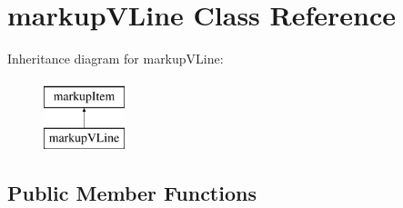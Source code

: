 \hypertarget{classmarkupVLine}{
\section{markupVLine Class Reference}
\label{classmarkupVLine}
}
Inheritance diagram for markupVLine:\begin{figure}[H]
\begin{center}
\leavevmode
\includegraphics[height=2.000000cm]{classmarkupVLine}
\end{center}
\end{figure}
\subsection*{Public Member Functions}
